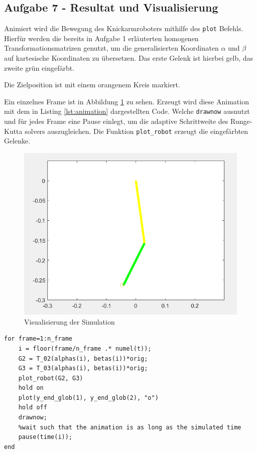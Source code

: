 \subsection*{Aufgabe 7 - Resultat und Visualisierung}

Animiert wird die Bewegung des Knickarmroboters mithilfe des \texttt{plot} Befehls. Hierfür werden die bereits in Aufgabe 1 erläuterten homogenen Transformationsmatrizen genutzt, um die generalisierten Koordinaten $\alpha$ und $\beta$ auf kartesische Koordinaten zu übersetzen. Das erste Gelenk ist hierbei gelb, das zweite grün eingefärbt. 

Die Zielposition ist mit einem orangenem Kreis markiert. 

Ein einzelnes Frame ist in Abbildung \ref{fig:vis} zu sehen. Erzeugt wird diese Animation mit dem in Listing \ref{lst:animation} dargestellten Code. 
Welche \texttt{drawnow} ausnutzt und für jedes Frame eine Pause einlegt, um die adaptive Schrittweite des Runge-Kutta solvers auszugleichen. Die Funktion \texttt{plot\_robot} erzeugt die eingefärbten Gelenke.

\begin{figure}[H]
    \centering
    \includegraphics[width=0.7\linewidth]{img/visualisierung.png}
    \caption{Visualisierung der Simulation}
    \label{fig:vis}
\end{figure}




\begin{lstlisting}[caption={Definition der rechten Seite}, label={lst:animation}]
for frame=1:n_frame
    i = floor(frame/n_frame .* numel(t));
    G2 = T_02(alphas(i), betas(i))*orig;
    G3 = T_03(alphas(i), betas(i))*orig;
    plot_robot(G2, G3)
    hold on
    plot(y_end_glob(1), y_end_glob(2), "o")
    hold off
    drawnow;
    %wait such that the animation is as long as the simulated time
    pause(time(i));
end

\end{lstlisting}


